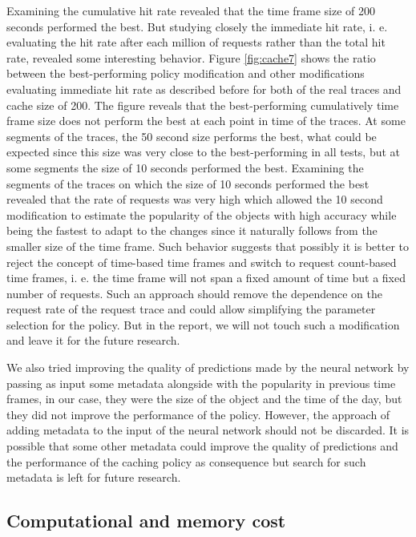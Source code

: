 Examining the cumulative hit rate revealed that the time frame size of 200 seconds performed the best. But studying closely the immediate hit rate, i. e. evaluating the hit rate after each million of requests rather than the total hit rate, revealed some interesting behavior. Figure \ref{fig:cache7} shows the ratio between the best-performing policy modification and other modifications evaluating immediate hit rate as described before for both of the real traces and cache size of 200. The figure reveals that the best-performing cumulatively time frame size does not perform the best at each point in time of the traces. At some segments of the traces, the 50 second size performs the best, what could be expected since this size was very close to the best-performing in all tests, but at some segments the size of 10 seconds performed the best. Examining the segments of the traces on which the size of 10 seconds performed the best revealed that the rate of requests was very high which allowed the 10 second modification to estimate the popularity of the objects with high accuracy while being the fastest to adapt to the changes since it naturally follows from the smaller size of the time frame. Such behavior suggests that possibly it is better to reject the concept of time-based time frames and switch to request count-based time frames, i. e. the time frame will not span a fixed amount of time but a fixed number of requests. Such an approach should remove the dependence on the request rate of the request trace and could allow simplifying the parameter selection for the policy. But in the report, we will not touch such a modification and leave it for the future research.

We also tried improving the quality of predictions made by the neural network by passing as input some metadata alongside with the popularity in previous time frames, in our case, they were the size of the object and the time of the day, but they did not improve the performance of the policy. However, the approach of adding metadata to the input of the neural network should not be discarded. It is possible that some other metadata could improve the quality of predictions and the performance of the caching policy as consequence but search for such metadata is left for future research.

\subsection{Computational and memory cost} \label{comp_mem_cost}

